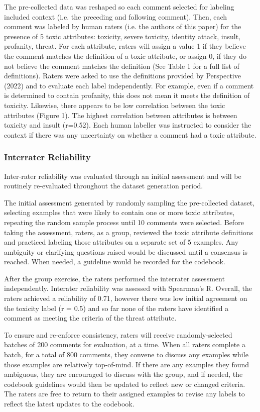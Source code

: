 \documentclass[11pt]{article}
\begin{document}
The pre-collected data was reshaped so each comment selected for labeling included context (i.e. the preceding and following comment). Then, each comment was labeled by human raters (i.e. the authors of this paper) for the presence of 5 toxic attributes: toxicity, severe toxicity, identity attack, insult, profanity, threat. For each attribute, raters will assign a value 1 if they believe the comment matches the definition of a toxic attribute, or assign 0, if they do not believe the comment matches the definition (See Table 1 for a full list of definitions). Raters were asked to use the definitions provided by Perspective (2022) and to evaluate each label independently. For example, even if a comment is determined to contain profanity, this does not mean it meets the definition of toxicity. Likewise, there appears to be low correlation between the toxic attributes (Figure 1). The highest correlation between attributes is between toxicity and insult (r=0.52). Each human labeller was instructed to consider the context if there was any uncertainty on whether a comment had a toxic attribute.

\subsubsection{Interrater Reliability}
Inter-rater reliability was evaluated through an initial assessment and will be routinely re-evaluated throughout the dataset generation period. 

The initial assessment generated by randomly sampling the pre-collected dataset, selecting examples that were likely to contain one or more toxic attributes, repeating the random sample process until 10 comments were selected. Before taking the assessment, raters, as a group, reviewed the toxic attribute definitions and practiced labeling those attributes on a separate set of 5 examples. Any ambiguity or clarifying questions raised would be discussed until a consensus is reached. When needed, a guideline would be recorded for the codebook.

After the group exercise, the raters performed the interrater assessment independently. Interater reliability was assessed with Spearman's R. Overall, the raters achieved a reliability of 0.71, however there was low initial agreement on the toxicity label (r = 0.5) and so far none of the raters have identified a comment as meeting the criteria of the threat attribute.

To ensure and re-enforce consistency, raters will receive randomly-selected batches of 200 comments for evaluation, at a time. When all raters complete a batch, for a total of 800 comments, they convene to discuss any examples while those examples are relatively top-of-mind. If there are any examples they found ambiguous, they are encouraged to discuss with the group, and if needed, the codebook guidelines would then be updated to reflect new or changed criteria. The raters are free to return to their assigned examples to revise any labels to reflect the latest updates to the codebook. 
\end{document}
